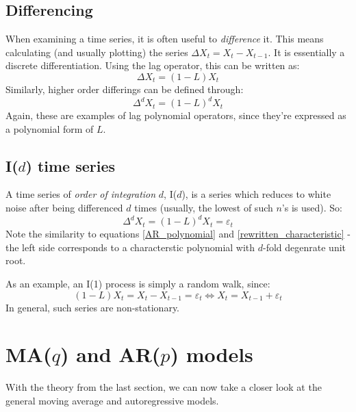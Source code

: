 \documentclass[12pt, a4paper]{article}
\numberwithin{equation}{section}
\begin{document}
\subsection{Differencing}
When examining a time series, it is often useful to \textit{difference} it. This means calculating (and usually plotting) the series $\Delta X_t=X_t-X_{t-1}$. It is essentially a discrete differentiation. Using the lag operator, this can be written as:
\begin{equation}
\Delta X_t=(1-L)X_t
\end{equation}
Similarly, higher order differings can be defined through:
\begin{equation}
\Delta^d X_t=(1-L)^d X_t
\end{equation}
Again, these are examples of lag polynomial operators, since they're expressed as a polynomial form of $L$.

\subsection{I($d$) time series}
A time series of \textit{order of integration} $d$, I($d$), is a series which reduces to white noise after being differenced $d$ times (usually, the lowest of such $n$'s is used). So:
\begin{equation}
\Delta^d X_t=(1-L)^d X_t=\varepsilon_t
\end{equation}
Note the similarity to equations \ref{AR_polynomial} and \ref{rewritten_characteristic} - the left side corresponds to a characterstic polynomial with $d$-fold degenrate unit root.

As an example, an I(1) process is simply a random walk, since:
\begin{equation}
(1-L)X_t=X_t-X_{t-1}=\varepsilon_t\Leftrightarrow X_t=X_{t-1}+\varepsilon_t
\end{equation}
In general, such series are non-stationary.

\section{MA($q$) and AR($p$) models}
With the theory from the last section, we can now take a closer look at the general moving average and autoregressive models.
\end{document}
